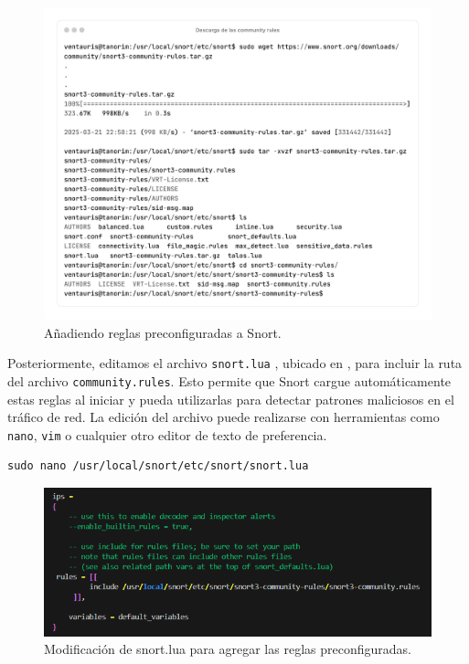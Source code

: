 \documentclass[11pt,a4paper,twoside]{report}
\begin{document}
\begin{figure}[H]
	\centering
	\includegraphics[scale=0.12]{instalacion_reglas_snort/1-1.png}
	\caption{Añadiendo reglas preconfiguradas a Snort.}
\end{figure}

\pagebreak

Posteriormente, editamos el archivo \texttt{snort.lua} \cite{snort_user_manual}, ubicado en , para incluir la ruta del archivo \texttt{community.rules}. Esto permite que Snort cargue automáticamente estas reglas al iniciar y pueda utilizarlas para detectar patrones maliciosos en el tráfico de red. La edición del archivo puede realizarse con herramientas como \texttt{nano}, \texttt{vim} o cualquier otro editor de texto de preferencia.

\begin{lstlisting}[style=commandstyle, caption={Editando el archivo snort.lua para incluir reglas personalizadas}]
	sudo nano /usr/local/snort/etc/snort/snort.lua
\end{lstlisting}

\begin{figure}[H]
	\centering
	\includegraphics[scale=0.8]{instalacion_reglas_snort/2.png}
	\caption{Modificación de snort.lua para agregar las reglas preconfiguradas.}
\end{figure}
\end{document}
